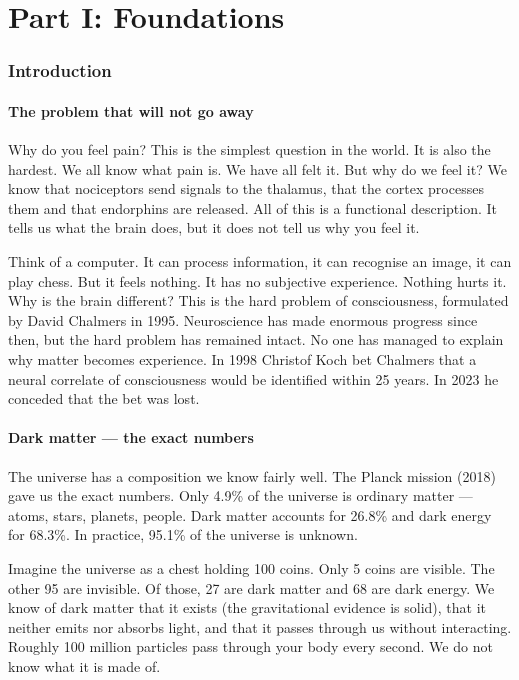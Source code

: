 \documentclass[11pt,a4paper]{article}
\begin{document}
\newpage
\part*{Part I: Foundations}
\section{Introduction}

\subsection{The problem that will not go away}
Why do you feel pain? This is the simplest question in the world. It is also the hardest. We all know what pain is. We have all felt it. But why do we feel it? We know that nociceptors send signals to the thalamus, that the cortex processes them and that endorphins are released. All of this is a functional description. It tells us what the brain does, but it does not tell us why you feel it.

Think of a computer. It can process information, it can recognise an image, it can play chess. But it feels nothing. It has no subjective experience. Nothing hurts it. Why is the brain different? This is the hard problem of consciousness, formulated by David Chalmers in 1995. Neuroscience has made enormous progress since then, but the hard problem has remained intact. No one has managed to explain why matter becomes experience. In 1998 Christof Koch bet Chalmers that a neural correlate of consciousness would be identified within 25 years. In 2023 he conceded that the bet was lost.

\subsection{Dark matter --- the exact numbers}
The universe has a composition we know fairly well. The Planck mission (2018) gave us the exact numbers. Only 4.9\% of the universe is ordinary matter --- atoms, stars, planets, people. Dark matter accounts for 26.8\% and dark energy for 68.3\%. In practice, 95.1\% of the universe is unknown.

Imagine the universe as a chest holding 100 coins. Only 5 coins are visible. The other 95 are invisible. Of those, 27 are dark matter and 68 are dark energy. We know of dark matter that it exists (the gravitational evidence is solid), that it neither emits nor absorbs light, and that it passes through us without interacting. Roughly 100 million particles pass through your body every second. We do not know what it is made of.
\end{document}
